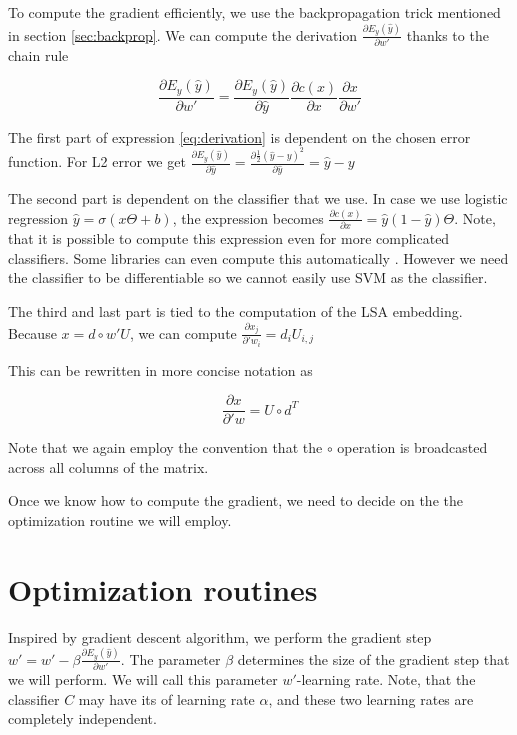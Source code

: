     To compute the gradient efficiently, we use the backpropagation trick mentioned in section \ref{sec:backprop}.
    We can compute the derivation $\frac{\partial E_y(\hat{y})}{\partial w'}$ thanks to the chain rule
    
    \begin{equation} \label{eq:derivation}
    \frac{\partial E_y(\hat{y})}{\partial w'} = \frac{\partial E_y(\hat{y})}{\partial \hat{y}} \frac{\partial c(x)}{\partial x} \frac{\partial x}{\partial w'}
    \end{equation}
    
    The first part of expression \ref{eq:derivation} is dependent on the chosen error function. 
    For L2 error we get 
    $\frac{\partial E_y(\hat{y})}{\partial \hat{y}} = \frac{\partial \frac{1}{2}(\hat{y}-y)^2}{\partial \hat{y}} = \hat{y}-y$
    
    The second part is dependent on the classifier that we use. 
    In case we use logistic regression $\hat{y} = \sigma(x \Theta + b)$, the expression becomes
    $\frac{\partial c(x)}{\partial x} = \hat{y} (1-\hat{y}) \Theta$.
    Note, that it is possible to compute this expression even for more complicated classifiers. 
    Some libraries can even compute this automatically \cite{tensorflow2015-whitepaper}.
    However we need the classifier to be differentiable so we cannot easily use SVM as the classifier. 
    
    The third and last part is tied to the computation of the LSA embedding.
    Because $x = d \circ w' U$, we can compute 
    $\frac{\partial x_j}{\partial 'w_i} = d_i U_{i,j}$
    
    This can be rewritten in more concise notation as 
    
    $$\frac{\partial x}{\partial 'w} = U \circ d^T$$
    
    Note that we again employ the convention that the $\circ$ operation is broadcasted across all columns of the matrix.

    Once we know how to compute the gradient, we need to decide on the the optimization routine we will employ.

\section{Optimization routines}
    
    Inspired by gradient descent algorithm, we perform the gradient step $w' = w' - \beta \frac{\partial E_y(\hat{y})}{\partial w'}$. 
    The parameter $\beta$ determines the size of the gradient step that we will perform.
    We will call this parameter $w'$-learning rate. 
    Note, that the classifier $C$ may have its of learning rate $\alpha$, and these two learning rates are completely independent.
    
